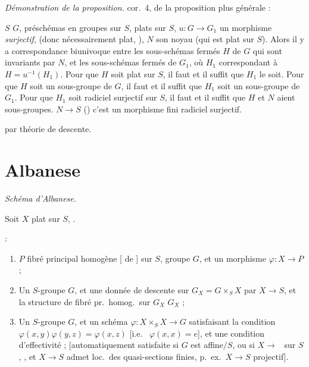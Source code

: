 \documentclass[11pt,a4paper]{article}
\begin{document}
\emph{Démonstration de la proposition.} \struck{\ill{}} \ill{} \ill{}
\struck{\ill{}} \ill{} cor.~4,  \ill{} de la proposition plus
générale :

\textbf{}  $S$ 
 \struck{\ill{}} $G$,  préschémas en
groupes  sur $S$, \struck{\ill{}} \add{\ill{} \ill{}}
plats sur $S$, $u \colon G \to G_1$ un morphisme \emph{surjectif}, (donc
nécessairement plat, ), $N$ son noyau (qui est plat
 sur $S$). Alors il y a correspondance biunivoque entre les
sous-schémas fermés $H$ de $G$ qui sont invariants par $N$, et les
sous-schémas fermés  de $G_1$, où $H_1$ correspondant à
$H = u^{-1}(H_1)$. Pour que $H$ soit  plat sur $S$, il faut
et il suffit que $H_1$ le soit. Pour que $H$ soit un sous-groupe de $G$, il
faut et il suffit que $H_1$ soit un sous-groupe de $G_1$. Pour que
 $H_1$ soit radiciel surjectif sur $S$, il faut et
il suffit que $H$ et $N$ aient \add{\ill{}} \ill{} sous-groupes.
 \ill{} $N \to S$  
(\ill{}) c'est un morphisme fini radiciel surjectif.
\marginal{\ill{} \ill{} \ill{} \ill{} \ill{} \ill{}}

 par théorie de descente.

\section{Albanese}

\emph{Schéma d'Albanese.}

Soit $X$   plat  sur $S$,
.

   :
\begin{enumerate}
  \item[(i)] $P$ fibré principal homogène [\ill{} \ill{} \ill{} \ill{} de
  ] sur $S$, \ill{} groupe $G$, et un \ill{}
  morphisme $\varphi \colon X \to P$ ;
  \item[(i bis)] Un $S$-groupe $G$, et une donnée de descente \ill{} sur
  $G_X = G \times_S X$ par $X \to S$, et la structure de fibré pr.\ homog.\
  sur $G_X$ \add{\ill{}} \ill{} \ill{} $G_X$ ;
  \item[(ii)] Un $S$-groupe $G$, et un schéma
  $\varphi \colon X \times_S X \to G$ satisfaisant la condition
  $\varphi(x,y)\varphi(y,z) = \varphi(x,z)$ [i.e.\ \ill{} \ill{} \ill{}
  $\varphi(x,x) = e$], et une condition d'effectivité ; [automatiquement
  satisfaite si $G$ est affine$/S$, ou si \ill{} $X \to$ \
  sur $S$, \ill{} \ill{} \ill{} \ill{} \ill{} \ill{}, et $X \to S$ admet loc.\
  des quasi-sections finies, p.~ex.\ $X \to S$ projectif].
\end{enumerate}
\note{en marge gauche, en face de (i bis), un carré :}
\end{document}
